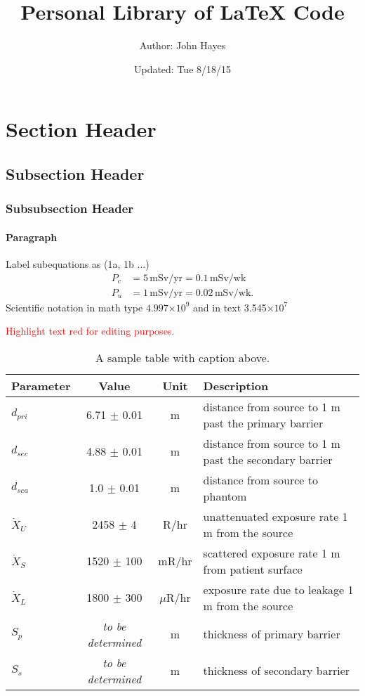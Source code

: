 \documentclass[11pt, oneside]{article}   	%
\title{Personal Library of LaTeX Code \\ }
\author{Author: John Hayes}
\date{Updated: Tue 8/18/15}							%
\newcommand{\edit}{\textcolor{red}}      %
\providecommand{\e}[1]{\ensuremath{\times 10^{#1}}} 		%
\begin{document}
\maketitle
\doublespacing
%

\section{Section Header}
\subsection{Subsection Header}
\subsubsection{Subsubsection Header}
\paragraph{Paragraph} 

Label subequations as (1a, 1b ...)
%
\begin{subequations} \label{eqn:Pvalues}
\begin{align} 
P_c &= 5 \, \text{mSv/yr} = 0.1 \, \text{mSv/wk}  \\
P_u &= 1 \, \text{mSv/yr} = 0.02 \, \text{mSv/wk}.
\end{align} 
\end{subequations}
%
Scientific notation in math type $4.997\e{9}$ and in text 3.545\e{7}  

\edit{Highlight text red for editing purposes.} \\

\begin{table}[h!]
\centering
\caption{A sample table with caption above.}
\label{tab:shieldingParams}
\begin{tabular}{|l|c|c|l|}
\hline
Parameter  & Value & Unit & Description \\
\hline 
$d_{pri}$ & 6.71 $\pm$ 0.01 & m & distance from source to 1 m past the primary barrier \\ \hline
$d_{sec}$ & 4.88 $\pm$ 0.01 & m & distance from source to 1 m past the secondary barrier \\ \hline
$d_{sca}$ & 1.0 $\pm$ 0.01 & m & distance from source to phantom \\ \hline
$\dot{X}_U$ & 2458 $\pm$ 4 & R/hr & unattenuated exposure rate 1 m from the source \\ \hline
$\dot{X}_S$ & 1520  $\pm$ 100 & mR/hr & scattered exposure rate 1 m from patient surface \\ \hline
$\dot{X}_L$ & 1800 $\pm$ 300 & $\mu$R/hr & exposure rate due to leakage 1 m from the source \\ \hline
$S_p$ & \textit{to be determined} & m & thickness of primary barrier \\ \hline
$S_s$ & \textit{to be determined} & m & thickness of secondary barrier \\ 
\hline
\end{tabular}
\end{table}
%
\end{document}
